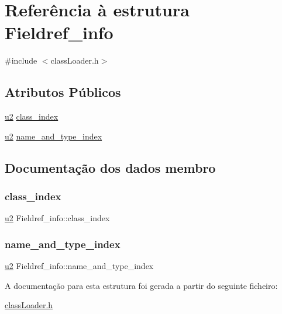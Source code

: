 \hypertarget{struct_fieldref__info}{}\section{Referência à estrutura Fieldref\+\_\+info}
\label{struct_fieldref__info}


{\ttfamily \#include $<$class\+Loader.\+h$>$}

\subsection*{Atributos Públicos}
\begin{DoxyCompactItemize}
\item 
\hyperlink{util_8h_a55ef8d87fd202b8417704c089899c5b9}{u2} \hyperlink{struct_fieldref__info_a8b4e2f46760596f37b281d7ffda73ca3}{class\+\_\+index}
\item 
\hyperlink{util_8h_a55ef8d87fd202b8417704c089899c5b9}{u2} \hyperlink{struct_fieldref__info_aa8062f358372c05bcc382de3edcbcfc2}{name\+\_\+and\+\_\+type\+\_\+index}
\end{DoxyCompactItemize}


\subsection{Documentação dos dados membro}
\mbox{\label{struct_fieldref__info_a8b4e2f46760596f37b281d7ffda73ca3}} 
\subsubsection{\texorpdfstring{class\+\_\+index}{class\_index}}
{\footnotesize\ttfamily \hyperlink{util_8h_a55ef8d87fd202b8417704c089899c5b9}{u2} Fieldref\+\_\+info\+::class\+\_\+index}

\mbox{\label{struct_fieldref__info_aa8062f358372c05bcc382de3edcbcfc2}} 
\subsubsection{\texorpdfstring{name\+\_\+and\+\_\+type\+\_\+index}{name\_and\_type\_index}}
{\footnotesize\ttfamily \hyperlink{util_8h_a55ef8d87fd202b8417704c089899c5b9}{u2} Fieldref\+\_\+info\+::name\+\_\+and\+\_\+type\+\_\+index}



A documentação para esta estrutura foi gerada a partir do seguinte ficheiro\+:\begin{DoxyCompactItemize}
\item 
\hyperlink{class_loader_8h}{class\+Loader.\+h}\end{DoxyCompactItemize}
